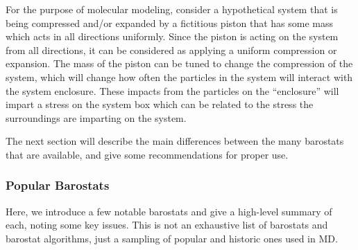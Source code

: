 \documentclass[9pt,bestpractices]{livecoms}
\begin{document}
For the purpose of molecular modeling, consider a hypothetical system that is being compressed and/or expanded by a fictitious piston that has some mass which acts in all directions uniformly.
Since the piston is acting on the system from all directions, it can be considered as applying a uniform compression or expansion.
The mass of the piston can be tuned to change the compression of the system, which will change how often the particles in the system will interact with the system enclosure.
These impacts from the particles on the ``enclosure'' will impart a stress on the system box which can be related to the stress the surroundings are imparting on the system.


The next section will describe the main differences between the many barostats that are available, and give some recommendations for proper use.

\subsubsection{Popular Barostats}
Here, we introduce a few notable barostats and give a high-level summary of each, noting some key issues.
This is not an exhaustive list of barostats and barostat algorithms, just a sampling of popular and historic ones used in MD\@.
\end{document}
